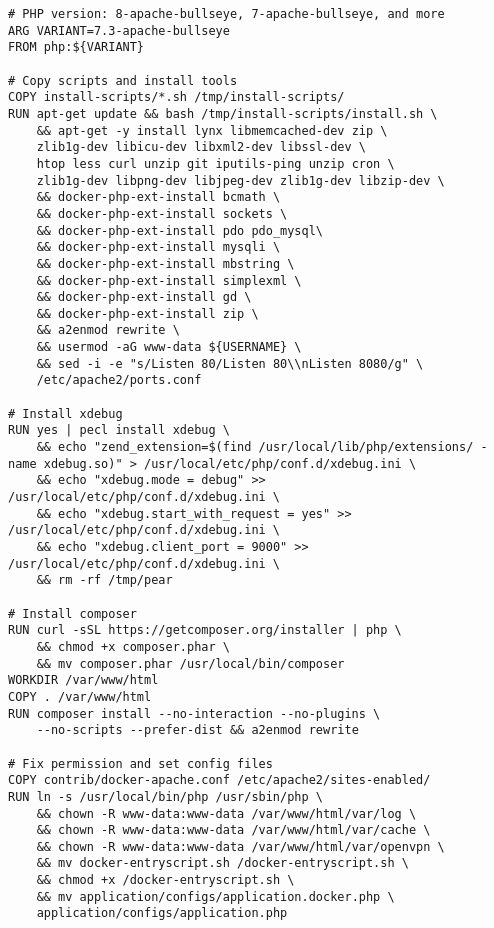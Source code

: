 
\begin{lstlisting}[language=docker, frame=single, caption={PHP DevContainer Dockerfile},label=code::docker_dev_php]
# PHP version: 8-apache-bullseye, 7-apache-bullseye, and more
ARG VARIANT=7.3-apache-bullseye
FROM php:${VARIANT}

# Copy scripts and install tools
COPY install-scripts/*.sh /tmp/install-scripts/
RUN apt-get update && bash /tmp/install-scripts/install.sh \
    && apt-get -y install lynx libmemcached-dev zip \
    zlib1g-dev libicu-dev libxml2-dev libssl-dev \
    htop less curl unzip git iputils-ping unzip cron \
    zlib1g-dev libpng-dev libjpeg-dev zlib1g-dev libzip-dev \
    && docker-php-ext-install bcmath \
    && docker-php-ext-install sockets \
    && docker-php-ext-install pdo pdo_mysql\
    && docker-php-ext-install mysqli \
    && docker-php-ext-install mbstring \
    && docker-php-ext-install simplexml \
    && docker-php-ext-install gd \
    && docker-php-ext-install zip \
    && a2enmod rewrite \
    && usermod -aG www-data ${USERNAME} \
    && sed -i -e "s/Listen 80/Listen 80\\nListen 8080/g" \
    /etc/apache2/ports.conf

# Install xdebug
RUN yes | pecl install xdebug \
    && echo "zend_extension=$(find /usr/local/lib/php/extensions/ -name xdebug.so)" > /usr/local/etc/php/conf.d/xdebug.ini \
    && echo "xdebug.mode = debug" >> /usr/local/etc/php/conf.d/xdebug.ini \
    && echo "xdebug.start_with_request = yes" >> /usr/local/etc/php/conf.d/xdebug.ini \
    && echo "xdebug.client_port = 9000" >> /usr/local/etc/php/conf.d/xdebug.ini \
    && rm -rf /tmp/pear

# Install composer
RUN curl -sSL https://getcomposer.org/installer | php \
    && chmod +x composer.phar \
    && mv composer.phar /usr/local/bin/composer
WORKDIR /var/www/html
COPY . /var/www/html
RUN composer install --no-interaction --no-plugins \
    --no-scripts --prefer-dist && a2enmod rewrite

# Fix permission and set config files
COPY contrib/docker-apache.conf /etc/apache2/sites-enabled/
RUN ln -s /usr/local/bin/php /usr/sbin/php \
    && chown -R www-data:www-data /var/www/html/var/log \
    && chown -R www-data:www-data /var/www/html/var/cache \
    && chown -R www-data:www-data /var/www/html/var/openvpn \
    && mv docker-entryscript.sh /docker-entryscript.sh \
    && chmod +x /docker-entryscript.sh \
    && mv application/configs/application.docker.php \
    application/configs/application.php
\end{lstlisting}



